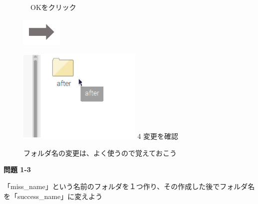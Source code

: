 \documentclass[a4paper,12pt]{jarticle}
\begin{document}
\begin{figure}[ht]
\begin{minipage}{6.973cm}
　OKをクリック
\end{minipage}
\includegraphics[width=1.919cm,height=1.365cm]{textbook-img053.png}
\begin{minipage}{5.751cm}
\includegraphics[width=5.92cm,height=4.51cm]{textbook-img056.png}
4 変更を確認
\end{minipage}
\centering

\begin{minipage}{5.751cm}
フォルダ名の変更は、よく使うので覚えておこう
\end{minipage}
\end{figure}


{\bfseries
問題 1-3}

「miss\_name」という名前のフォルダを１つ作り、その作成した後でフォルダ名を「success\_name」に変えよう
\end{document}
